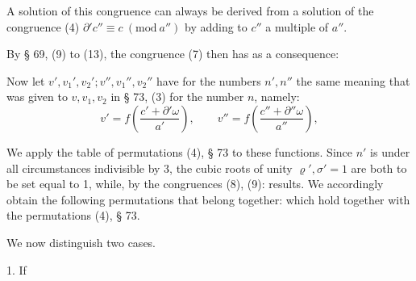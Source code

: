 A solution of this congruence can always be derived from a solution of the
congruence (4) $\partial' c'' \equiv c \ (\mathrm{mod}\ a'')$ by adding to
$c''$ a multiple of $a''$.

By § 69, (9) to (13), the congruence (7) then has as a consequence:

Now let $v', v_1', v_2'; v'', v_1'', v_2''$ have for the numbers
$n', n''$ the same meaning that was given to $v, v_1, v_2$ in § 73, (3) for
the number $n$, namely:
\[
v' = f\left(\frac{c' + \partial'\omega}{a'}\right), \qquad
v'' = f\left(\frac{c'' + \partial''\omega}{a''}\right),
\]

We apply the table of permutations (4), § 73 to these functions. Since $n'$
is under all circumstances indivisible by 3, the cubic roots of unity
$\varrho', \sigma' = 1$ are both to be set equal to 1, while, by the
congruences (8), (9):
results. We accordingly obtain the following permutations that belong together:
which hold together with the permutations (4), § 73.

We now distinguish two cases.

1. If
